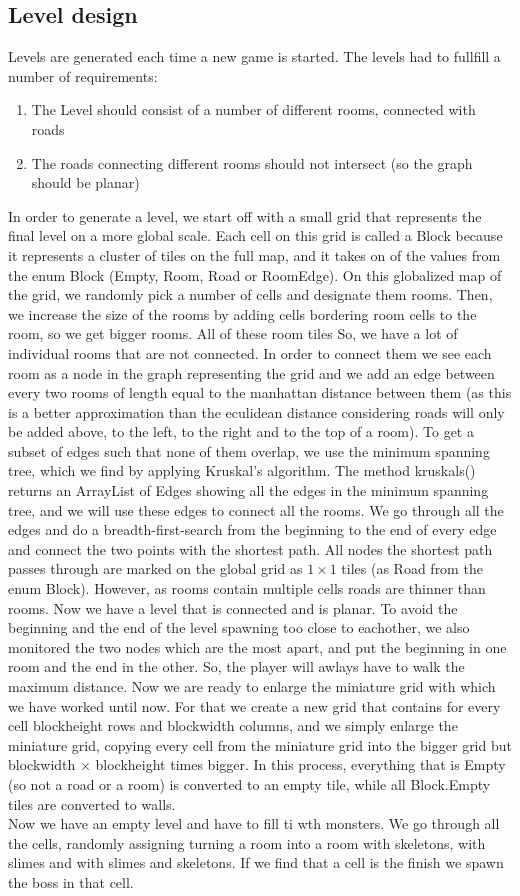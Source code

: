 \documentclass[../main.tex]{subfiles}
\begin{document}
		\subsection {Level design}
		Levels are generated each time a new game is started. The levels had to fullfill a number of requirements:
		\begin {enumerate}
			\item {The Level should consist of a number of different rooms, connected with roads}
			\item {The roads connecting different rooms should not intersect (so the graph should be planar)}
		\end {enumerate}
		In order to generate a level, we start off with a small grid that represents the final level on a more global scale. Each cell on this grid is called a Block because it represents a cluster of tiles on the full map, and it takes on of the values from the enum Block (Empty, Room, Road or RoomEdge). On this globalized map of the grid, we randomly pick a number of cells and designate them rooms. Then, we increase the size of the rooms by adding cells bordering room cells to the room, so we get bigger rooms. All of these room tiles  So, we have a lot of individual rooms that are not connected. In order to connect them we see each room as a node in the graph representing the grid and we add an edge between every two rooms of length equal to the manhattan distance between them (as this is a better approximation than the eculidean distance considering roads will only be added above, to the left, to the right and to the top of a room). To get a subset of edges such that none of them overlap, we use the minimum spanning tree, which we find by applying Kruskal's algorithm. The method kruskals() returns an ArrayList of Edges showing all the edges in the minimum spanning tree, and we will use these edges to connect all the rooms. We go through all the edges and do a breadth-first-search from the beginning to the end of every edge and connect the two points with the shortest path. All nodes the shortest path passes through are marked on the global grid as $1\times1$ tiles (as Road from the enum Block). However, as rooms contain multiple cells roads are thinner than rooms. Now we have a level that is connected and is planar. To avoid the beginning and the end of the level spawning too close to eachother, we also monitored the two nodes which are the most apart, and put the beginning in one room and the end in the other. So, the player will awlays have to walk the maximum distance. Now we are ready to enlarge the miniature grid with which we have worked until now. For that we create a new grid that contains for every cell blockheight rows and blockwidth columns, and we simply enlarge the miniature grid, copying every cell from the miniature grid into the bigger grid but blockwidth $\times$ blockheight times bigger. In this process, everything that is Empty (so not a road or a room) is converted to an empty tile, while all Block.Empty tiles are converted to walls.\\
			Now we have an empty level and have to fill ti wth monsters. We go through all the cells, randomly assigning turning a room into a room with skeletons, with slimes and with slimes and skeletons. If we find that a cell is the finish we spawn the boss in that cell.
\end{document}

